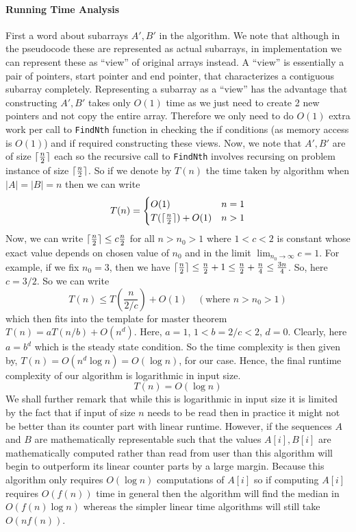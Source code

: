 \documentclass[answers]{exam}
\begin{document}
\begin{questions}
\begin{solution}
\paragraph{Running Time Analysis}
First a word about subarrays $A',B'$ in the algorithm. We note that although in the pseudocode these are represented as actual subarrays, in implementation we can represent these as ``view'' of original arrays instead. A ``view'' is essentially a pair of pointers, start pointer and end pointer, that characterizes a contiguous subarray completely. Representing a subarray as a ``view'' has the advantage that constructing $A',B'$ takes only $O(1)$ time as we just need to create 2 new pointers and not copy the entire array. Therefore we only need to do $O(1)$ extra work per call to \texttt{FindNth} function in checking the if conditions (as memory access is $O(1)$) and if required constructing these views. Now, we note that $A',B'$ are of size $\lceil\frac{n}{2}\rceil$ each so the recursive call to \texttt{FindNth} involves recursing on problem instance of size $\lceil\frac{n}{2}\rceil$. So if we denote by $T(n)$ the time taken by algorithm when $|A| = |B| = n$ then we can write
\[
    T(n) = 
    \begin{cases}
        O(1) & n=1 \\
        T(\lceil\frac{n}{2}\rceil) + O(1) & n > 1 \\
    \end{cases}
\]
Now, we can write $\lceil\frac{n}{2}\rceil \leq c \frac{n}{2}$ for all $n > n_0 > 1$ where $1 < c < 2$ is constant whose exact value depends on chosen value of $n_0$ and in the limit $\lim_{n_0 \to \infty} c = 1$. For example, if we fix $n_0 = 3$, then we have $\lceil\frac{n}{2}\rceil \leq \frac{n}{2} + 1 \leq \frac{n}{2} + \frac{n}{4} \leq \frac{3n}{4}$. So, here $c = 3/2$. So we can write
\[
    T(n) \leq T({\frac{n}{2/c}}) + O(1) \quad (\text{where } n > n_0 > 1)
\]
which then fits into the template for master theorem $T(n) = a T(n/b) + O(n^d)$. Here, $a=1$, $1 < b=2/c < 2$, $d = 0$. Clearly, here $a = b^d$ which is the steady state condition. So the time complexity is then given by, $T(n) = O(n^d \log n) = O(\log n)$, for our case.
Hence, the final runtime complexity of our algorithm is logarithmic in input size.
\[
    T(n) = O(\log n)
\]
We shall further remark that while this is logarithmic in input size it is limited by the fact that if input of size $n$ needs to be read then in practice it might not be better than its counter part with linear runtime. However, if the sequences $A$ and $B$ are mathematically representable such that the values $A[i], B[i]$ are mathematically computed rather than read from user than this algorithm will begin to outperform its linear counter parts by a large margin. Because this algorithm only requires $O(\log n)$ computations of $A[i]$ so if computing $A[i]$ requires $O(f(n))$ time in general then the algorithm will find the median in $O(f(n) \log n)$ whereas the simpler linear time algorithms will still take $O(n f(n))$.  
\end{solution}





\end{questions}
\end{document}
